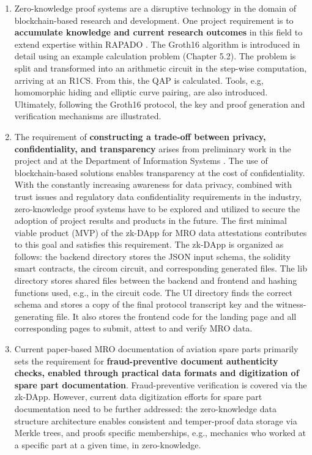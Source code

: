 \begin{enumerate}
    \item Zero-knowledge proof systems are a disruptive technology in the domain of blockchain-based research and development. One project requirement is to \textbf{accumulate knowledge and current research outcomes} in this field to extend expertise within RAPADO \citep{ZedelJ}. The Groth16 algorithm is introduced in detail using an example calculation problem (Chapter 5.2). The problem is split and transformed into an arithmetic circuit in the step-wise computation, arriving at an R1CS. From this, the QAP is calculated. Tools, e.g, homomorphic hiding and elliptic curve pairing, are also introduced. Ultimately, following the Groth16 protocol, the key and proof generation and verification mechanisms are illustrated.
    \item The requirement of \textbf{constructing a trade-off between privacy, confidentiality, and transparency} arises from preliminary work in the project and at the Department of Information Systems \citep{ZedelJ}. The use of blockchain-based solutions enables transparency at the cost of confidentiality. With the constantly increasing awareness for data privacy, combined with trust issues and regulatory data confidentiality requirements in the industry, zero-knowledge proof systems have to be explored and utilized to secure the adoption of project results and products in the future. The first minimal viable product (MVP) of the zk-DApp for MRO data attestations contributes to this goal and satisfies this requirement. The zk-DApp is organized as follows: the backend directory stores the JSON input schema, the solidity smart contracts, the circom circuit, and corresponding generated files. The lib directory stores shared files between the backend and frontend and hashing functions used, e.g., in the circuit code. The UI directory finds the correct schema and stores a copy of the final protocol transcript key and the witness-generating file. It also stores the frontend code for the landing page and all corresponding pages to submit, attest to and verify MRO data.
    \item Current paper-based MRO documentation of aviation spare parts primarily sets the requirement for \textbf{fraud-preventive document authenticity checks, enabled through practical data formats and digitization of spare part documentation}. Fraud-preventive verification is covered via the zk-DApp. However, current data digitization efforts for spare part documentation need to be further addressed: the zero-knowledge data structure architecture enables consistent and temper-proof data storage via Merkle trees, and proofs specific memberships, e.g., mechanics who worked at a specific part at a given time, in zero-knowledge.
\end{enumerate}

